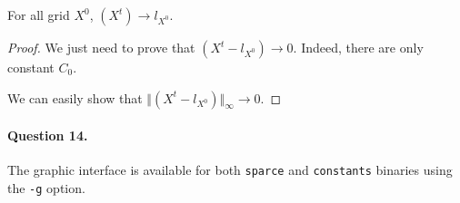 \begin{lemma}
    For all grid $X^0$, $(X^t) \to l_{X^0}$.
\end{lemma}
\begin{proof}
    We just need to prove that $(X^t-l_{X^0}) \to 0$. Indeed, there are only constant $C_0$.
    
    We can easily show that $\Vert (X^t-l_{X^0}) \Vert_\infty \to 0$.
\end{proof}


\paragraph{Question 14.}

The graphic interface is available for both \texttt{sparce} and \texttt{constants} binaries using the \texttt{-g} option.


